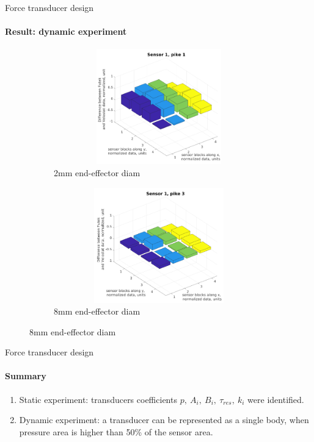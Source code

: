 \documentclass[aspectratio=169]{beamer}
\begin{document}
\begin{frame}[t]{Force transducer design}
    \framesubtitle{Result: dynamic experiment}
    \vspace{-15pt}
    \begin{figure}[H]
        \begin{subfigure}{0.49\textwidth}
            \centering\includegraphics[height=5cm,width=1\textwidth,keepaspectratio]{sens1_pike1.png}
            \caption*{2mm end-effector diam}
            \label{fig:sens1_pike1}
        \end{subfigure}
        \begin{subfigure}{0.49\textwidth}
            \centering\includegraphics[height=5cm,width=1\textwidth,keepaspectratio]{sens1_pike3.png}
            \caption*{8mm end-effector diam}
            \label{fig:sens1_pike3}
        \end{subfigure}
    \end{figure}
\end{frame}

\begin{frame}[t]{Force transducer design}
    \framesubtitle{Summary}
    \vspace{-15pt}
    {\Large
        \begin{enumerate}
            \item Static experiment: transducers coefficients $p,\ A_i,\ B_i,\ \tau_{res},\ k_i$ were identified.
            \item Dynamic experiment: a transducer can be represented as a single body, when pressure area is higher than 50\% of the sensor area.
        \end{enumerate}
    }
\end{frame}
\end{document}
